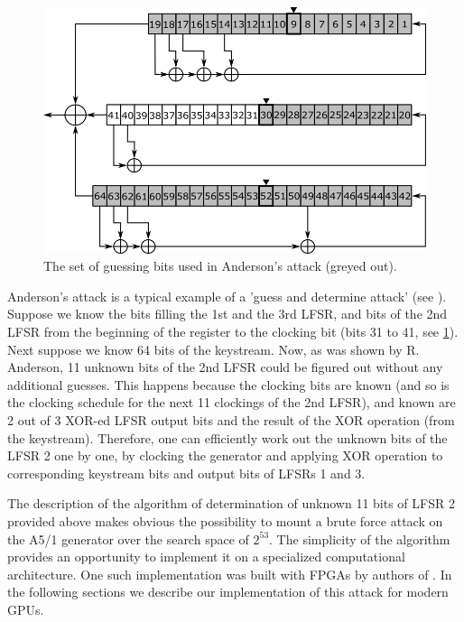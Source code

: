 \documentclass[runningheads,a4paper]{llncs}[2015/06/24]
\begin{document}
\begin{figure} \includegraphics[width=\linewidth]{./a51and.png} \caption{The
	set of guessing bits used in Anderson's attack (greyed out).}
\label{fig:a51and} \end{figure}


Anderson's attack is a typical example of a 'guess and determine attack' (see
\cite{BARD}). Suppose we know the bits filling the 1st and the 3rd LFSR, and
bits of the 2nd LFSR from the beginning of the register to the clocking bit
(bits 31 to 41, see \cref{fig:a51and}). Next suppose we know 64 bits of the
keystream. Now, as was shown by R. Anderson, 11 unknown bits of the 2nd LFSR
could be figured out without any additional guesses. This happens because the
clocking bits are known (and so is the clocking schedule for the next 11
clockings of the 2nd LFSR), and known are 2 out of 3 XOR-ed LFSR output bits
and the result of the XOR operation (from the keystream). Therefore, one can
efficiently work out the unknown bits of the LFSR 2 one by one, by clocking the
generator and applying XOR operation to corresponding keystream bits and output
bits of LFSRs 1 and 3.

The description of the algorithm of determination of unknown 11 bits of LFSR 2
provided above makes obvious the possibility to mount a brute force attack on
the A5/1 generator over the search space of $2^{53}$. The simplicity of the
algorithm provides an opportunity to implement it on a specialized
computational architecture. One such implementation was built with FPGAs by
authors of \cite{COPAC_1}. In the following sections we describe our
implementation of this attack for modern GPUs.
\end{document}
